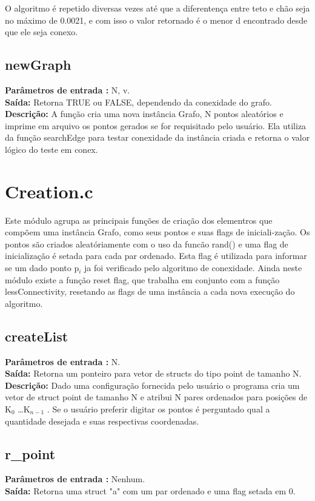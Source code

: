 \documentclass[a4paper,11pt]{article}
\begin{document}
O algoritmo é repetido diversas vezes até que a diferentença entre teto e chão seja no máximo de 0.0021, e com isso o valor retornado é o menor d encontrado desde que ele seja conexo.

\subsection{newGraph}
\textbf{Parâmetros de entrada :} N, v. \\
\textbf{Saída:} Retorna TRUE ou FALSE, dependendo da conexidade do grafo.\\

\textbf{Descrição:}
A função cria uma nova instância Grafo, N pontos aleatórios e imprime em arquivo os pontos gerados se for requisitado pelo usuário. Ela utiliza da função searchEdge para testar conexidade da instância criada e retorna o valor lógico do teste em conex.

\section{Creation.c}
  Este módulo agrupa as principais funções de criação dos elementros que compõem uma instância Grafo, como seus pontos e suas flags de iniciali-zação. Os pontos são criados aleatóriamente com o uso da funcão rand() e uma flag de inicialização é setada para cada par ordenado. Esta flag é utilizada para informar se um dado ponto p$_i$ ja foi verificado pelo algoritmo de conexidade. Ainda neste módulo existe a função reset flag, que trabalha em conjunto com a função lessConnectivity, resetando as flags de uma instância a cada nova execução do algoritmo.

\subsection{createList}
\textbf{Parâmetros de entrada :} N. \\
\textbf{Saída:} Retorna um ponteiro para vetor de structs do tipo point de tamanho N.\\

\textbf{Descrição:}
Dado uma configuração fornecida pelo usuário o programa cria um vetor de struct point de tamanho N e atribui N pares ordenados para posições de K$_0$ \ldots K$_{n-1}$ . Se o usuário preferir digitar os pontos é perguntado qual a quantidade desejada e suas respectivas coordenadas.

\subsection{r\_point}
\textbf{Parâmetros de entrada :} Nenhum. \\
\textbf{Saída:} Retorna uma struct "a" com um par ordenado e uma flag setada em 0.\\
\end{document}
